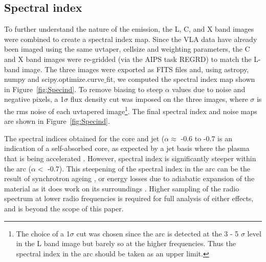 \documentclass[fleqn,usenatbib]{mnras}
\def\fig{Figure}
\begin{document}
\subsection{Spectral index}

To further understand the nature of the emission, the L,  C, and X band images were combined to create a spectral index map. Since the VLA data have already been imaged using the same uvtaper, cellsize and weighting parameters, the C and X band images were re-gridded (via the AIPS task REGRD) to match the L-band image. The three images were 
exported as FITS files and, using astropy, numpy and scipy.optimize.curve$\_$fit, we computed the spectral index map shown in \fig~\ref{fig:Specind}. To remove biasing to steep $\alpha$ values due to noise and negative pixels, a 1$\sigma$ flux density cut was imposed on the three images, where $\sigma$ is the rms noise of each uvtapered image\footnote{The choice of a 1$\sigma$ cut was chosen since the arc is detected at the 3 - 5 $\sigma$ level in the L band image but barely so at the higher frequencies. Thus the spectral index in the arc should be taken as an upper limit.}. The final spectral index and noise maps are shown in \fig~\ref{fig:Specind}. 

{The spectral indices obtained for the core and jet ($\alpha \approx$ -0.6 to -0.7 is an indication of a self-absorbed core, as expected by a jet basis where the plasma that is being accelerated \citep{NWF01}. However, spectral index is significantly steeper within the arc ($\alpha <$ -0.7). This steepening of the spectral index in the arc can be the result of synchrotron ageing \citep{CPDL91}, or energy losses due to adiabatic expansion of the material as it does work on its surroundings \citep{CPDL91}. Higher sampling of the radio spectrum at lower radio frequencies is required for full analysis of either effects, and is beyond the scope of this paper.}
\end{document}
